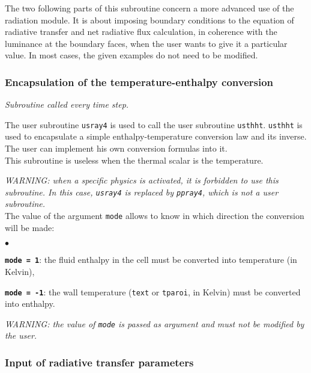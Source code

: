 {{\noindent
The two following parts of this subroutine concern a more advanced use
of the radiation module. It is about imposing boundary conditions to the
equation of radiative transfer and net radiative flux calculation, in
coherence with the luminance at the boundary faces, when the user wants
to give it a particular value. In most cases, the given examples do not
need to be modified.

\subsubsection{Encapsulation of the temperature-enthalpy conversion}

\noindent
\textit{Subroutine called every time step.}

The user subroutine \texttt{usray4} is used to call the user subroutine \texttt{usthht}. \texttt{usthht} is used to encapsulate a simple enthalpy-temperature
conversion law and its inverse. The user
can implement his own conversion formulas into it. \\
This subroutine is useless when the thermal scalar is the temperature.\\
\noindent

{\em WARNING: when a specific physics is activated, it is forbidden to use this
subroutine. In this case, {\em \texttt{usray4}} is replaced by {\em
\texttt{ppray4}}, which is not a user subroutine.}\\

\noindent
The value of the argument \texttt{mode} allows to know in which direction the
conversion will be made:
\begin{list}{$\bullet$}{}

\item \texttt{\textbf{mode = 1}}: the fluid enthalpy in the cell must be
      converted into temperature (in Kelvin),

\item \texttt{\textbf{mode = -1}}: the wall temperature (\texttt{text}
      or \texttt{tparoi}, in Kelvin) must be converted into enthalpy.

\end{list}
%
{\em WARNING: the value of \texttt{mode} is passed as argument and must not be
modified by the user.}\\

\subsubsection{Input of radiative transfer parameters}

}}
